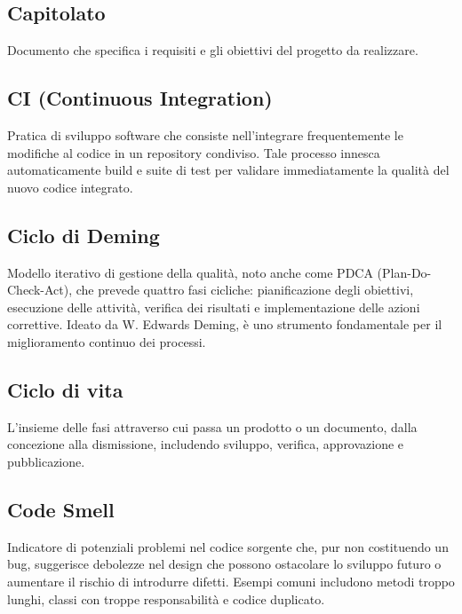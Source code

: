 \documentclass[a4paper, 11pt, oneside]{scrartcl} %
\begin{document}
\subsection*{Capitolato}
Documento che specifica i requisiti e gli obiettivi del progetto da realizzare.
\vspace{0.5cm}

\subsection*{CI (Continuous Integration)}
Pratica di sviluppo software che consiste nell'integrare frequentemente le modifiche al codice in un repository condiviso. Tale processo innesca automaticamente build e suite di test per validare immediatamente la qualità del nuovo codice integrato.
\vspace{0.5cm}

\subsection*{Ciclo di Deming}
Modello iterativo di gestione della qualità, noto anche come PDCA (Plan-Do-Check-Act), che prevede quattro fasi cicliche: pianificazione degli obiettivi, esecuzione delle attività, verifica dei risultati e implementazione delle azioni correttive. Ideato da W. Edwards Deming, è uno strumento fondamentale per il miglioramento continuo dei processi.
\vspace{0.5cm}

\subsection*{Ciclo di vita}


L'insieme delle fasi attraverso cui passa un prodotto o un documento, dalla concezione alla dismissione, includendo sviluppo, verifica, approvazione e pubblicazione.

\vspace{0.5cm}

\subsection*{Code Smell}
Indicatore di potenziali problemi nel codice sorgente che, pur non costituendo un bug, suggerisce debolezze nel design che possono ostacolare lo sviluppo futuro o aumentare il rischio di introdurre difetti. Esempi comuni includono metodi troppo lunghi, classi con troppe responsabilità e codice duplicato.
\vspace{0.5cm}
\end{document}
